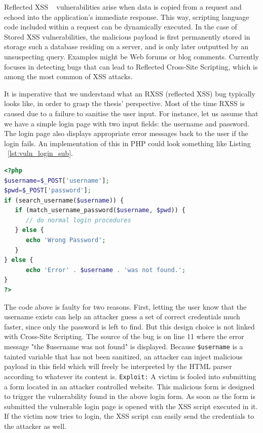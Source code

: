 Reflected XSS ~\cite{rxss_def} vulnerabilities arise when data is copied from a request and echoed into the application's immediate response. This way, scripting language code included within a request can be dynamically executed.
In the case of Stored XSS vulnerabilities, the malicious payload is first permanently stored in storage such a database residing on a server, and is only later outputted by an unsuspecting query. Examples might be Web forums or blog comments. 
Currently \pname focuses in detecting bugs that can lead to Reflected Cross-Site Scripting, which is among the most common of XSS attacks.

It is imperative that we understand what an RXSS (reflected XSS) bug typically looks like, in order to grasp the thesis' perspective. Most of the time RXSS is caused due to a failure to sanitise the user input. For instance, let us assume that we have a simple login page with two input fields: the username and password. The login page also displays appropriate error messages back to the user if the login fails. An implementation of this in PHP could look something like Listing ~\ref{lst:vuln_login_sub}.

\begin{lstlisting}[language=PHP, caption={Vulnerable login form.}, numbersep=5pt, label={lst:vuln_login_sub}]
<?php
$username=$_POST['username'];
$pwd=$_POST['password'];
if (search_username($username)) {
   if (match_username_password($username, $pwd)) {
      // do normal login procedures
   } else {
      echo 'Wrong Password';
   }
} else {
      echo 'Error' . $username . 'was not found.';
}
?>
\end{lstlisting}

The code above is faulty for two reasons. First, letting the user know that the username exists can help an attacker guess a set of correct credentials much faster, since only the password is left to find. But this design choice is not linked with Cross-Site Scripting. The source of the bug is on line 11 where the error message "the \$username was not found" is displayed. Because {\tt \$username} is a tainted variable that has not been sanitized, an attacker can inject malicious payload in this field which will freely be interpreted by the HTML parser according to whatever its content is. 
{\tt Exploit:} A victim is fooled into submitting a form located in an attacker controlled website. This malicious form is
designed to trigger the vulnerability found in the above login form. As soon as the form is submitted the vulnerable login
page is opened with the XSS script executed in it. If the victim now tries to login, the XSS script can easily send the
credentials to the attacker as well. 

